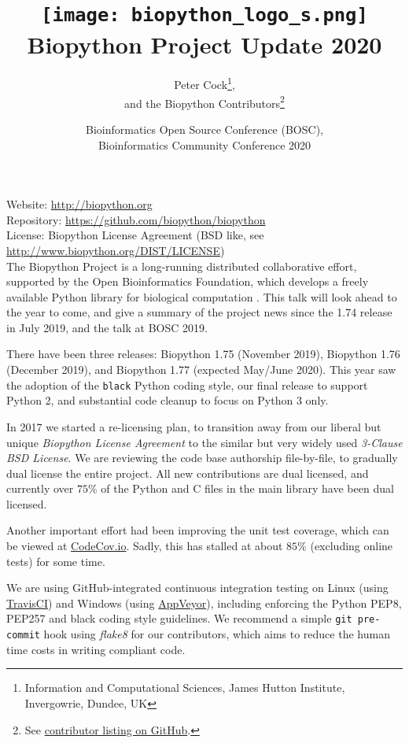 \documentclass[10pt,oneside]{article}
\title{%
\vspace{-1.5in}
\texttt{[image: biopython\_logo\_s.png]} \\
\vspace{3mm}Biopython Project Update 2020}
\author{
    Peter Cock\thanks{Information and Computational Sciences, James Hutton Institute, Invergowrie, Dundee, UK},\\
    and the Biopython Contributors\thanks{See \href{https://github.com/biopython/biopython/blob/master/CONTRIB.rst}{contributor listing on GitHub}.}}
\date{Bioinformatics Open Source Conference (BOSC),\\Bioinformatics Community Conference 2020}
\begin{document}
\maketitle
\thispagestyle{empty}

\vspace{-0.2in}
\noindent
Website: \url{http://biopython.org} \\
Repository: \url{https://github.com/biopython/biopython} \\
License: Biopython License Agreement (BSD like, see \url{http://www.biopython.org/DIST/LICENSE}) \\

The Biopython Project is a long-running distributed collaborative effort,
supported by the Open Bioinformatics Foundation, which develops a freely
available Python library for biological computation \cite{AppNote}. This
talk will look ahead to the year to come, and give a summary of the project
news since the 1.74 release in July 2019, and the talk at BOSC 2019.

There have been three releases: Biopython 1.75 (November 2019), Biopython 1.76
(December 2019), and Biopython 1.77 (expected May/June 2020). This year saw
the adoption of the \texttt{black} Python coding style, our final release to
support Python 2, and substantial code cleanup to focus on Python 3 only.

In 2017 we started a re-licensing plan, to transition away
from our liberal but unique \emph{Biopython License Agreement} to the similar
but very widely used \emph{3-Clause BSD License}. We are reviewing the code
base authorship file-by-file, to gradually dual license the entire project.
All new contributions are dual licensed, and currently over $75\%$ of the
Python and C files in the main library have been dual licensed.

Another important effort had been improving the unit test coverage, which can
be viewed at \href{https://codecov.io/github/biopython/biopython/}{CodeCov.io}.
Sadly, this has stalled at about $85\%$ (excluding online tests) for some time.

We are using GitHub-integrated continuous integration testing on Linux (using
\href{https://travis-ci.org/biopython/biopython/builds}{TravisCI}) and Windows
(using \href{https://ci.appveyor.com/project/biopython/biopython/history}{AppVeyor}),
including enforcing the Python PEP8, PEP257 and black coding style guidelines.
We recommend a simple \texttt{git pre-commit} hook using \textit{flake8} for
our contributors, which aims to reduce the human time costs in writing
compliant code.
\end{document}
